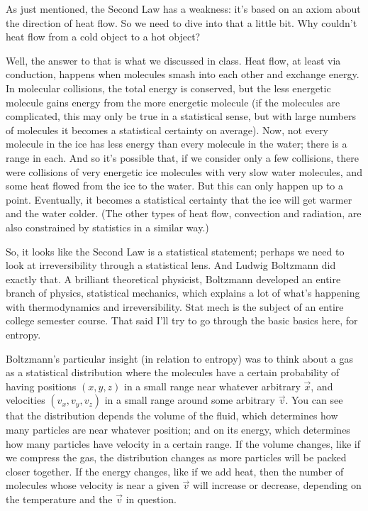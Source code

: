 \documentclass[12pt]{article}
\begin{document}
As just mentioned, the Second Law has a weakness: it's based on an axiom about the direction of heat flow. So we need to dive into that a little bit. Why couldn't heat flow from a cold object to a hot object?

Well, the answer to that is what we discussed in class. Heat flow, at least via conduction, happens when molecules smash into each other and exchange energy. In molecular collisions, the total energy is conserved, but the less energetic molecule gains energy from the more energetic molecule (if the molecules are complicated, this may only be true in a statistical sense, but with large numbers of molecules it becomes a statistical certainty on average). Now, not every molecule in the ice has less energy than every molecule in the water; there is a range in each. And so it's possible that, if we consider only a few collisions, there were collisions of very energetic ice molecules with very slow water molecules, and some heat flowed from the ice to the water. But this can only happen up to a point. Eventually, it becomes a statistical certainty that the ice will get warmer and the water colder. (The other types of heat flow, convection and radiation, are also constrained by statistics in a similar way.)

So, it looks like the Second Law is a statistical statement; perhaps we need to look at irreversibility through a statistical lens. And Ludwig Boltzmann did exactly that. A brilliant theoretical physicist, Boltzmann developed an entire branch of physics, statistical mechanics, which explains a lot of what's happening with thermodynamics and irreversibility. Stat mech is the subject of an entire college semester course. That said I'll try to go through the basic basics here, for entropy.

Boltzmann's particular insight (in relation to entropy) was to think about a gas as a statistical distribution where the molecules have a certain probability of having positions $(x,y,z)$ in a small range near whatever arbitrary $\vec{x}$, and velocities $(v_x,v_y,v_z)$ in a small range around some arbitrary $\vec{v}$. You can see that the distribution depends the volume of the fluid, which determines how many particles are near whatever position; and on its energy, which determines how many particles have velocity in a certain range.  If the volume changes, like if we compress the gas, the distribution changes as more particles will be packed closer together. If the energy changes, like if we add heat, then the number of molecules whose velocity is near a given $\vec{v}$ will increase or decrease, depending on the temperature and the $\vec{v}$ in question.
\end{document}
